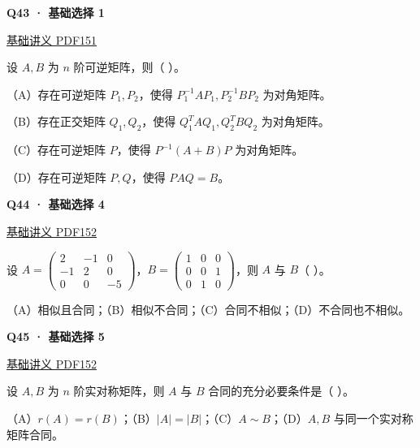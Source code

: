 \documentclass[UTF8,fontset=fandol,11pt,a4paper]{ctexart}
\newcommand{\source}[1]{{\footnotesize\color{Muted}#1\par}}
\newcommand{\qtitle}[2]{\par\needspace{5\baselineskip}\hypertarget{#1}{}\label{#1}\textbf{#2}\par}
\begin{document}
\begin{minipage}{\linewidth}
\qtitle{B-MC-01}{Q43 · 基础选择 1}
\source{\href{file:///Users/skyintelligence/Desktop/\%E5\%BE\%97\%E8\%AF\%BB\%E4\%B8\%AA\%E7\%A0\%94-\%E5\%8C\%97\%E5\%A4\%A7\%E8\%BD\%AF\%E5\%BE\%AE/\%E6\%95\%B0\%E5\%AD\%A6\%20150/\%E8\%AE\%B2\%E4\%B9\%89/\%E3\%80\%90\%E4\%B8\%80\%E9\%AB\%98\%E6\%95\%B0Kira\%E3\%80\%9127\%E8\%80\%83\%E7\%A0\%94\%E7\%BA\%BF\%E4\%BB\%A3\%E5\%9F\%BA\%E7\%A1\%80\%E8\%AE\%B2\%E4\%B9\%89\%26\%E4\%B9\%A0\%E9\%A2\%98-\%E7\%94\%B5\%E5\%AD\%90\%E7\%89\%88.pdf\#page=151}{基础讲义 PDF151}}
设 $A,B$ 为 $n$ 阶可逆矩阵，则（ ）。

（A）存在可逆矩阵 $P_1,P_2$，使得 $P_1^{-1}AP_1,P_2^{-1}BP_2$ 为对角矩阵。

（B）存在正交矩阵 $Q_1,Q_2$，使得 $Q_1^TAQ_1,Q_2^TBQ_2$ 为对角矩阵。

（C）存在可逆矩阵 $P$，使得 $P^{-1}(A+B)P$ 为对角矩阵。

（D）存在可逆矩阵 $P,Q$，使得 $PAQ=B$。
\end{minipage}\par\vspace{7mm}
\begin{minipage}{\linewidth}
\qtitle{B-MC-04}{Q44 · 基础选择 4}
\source{\href{file:///Users/skyintelligence/Desktop/\%E5\%BE\%97\%E8\%AF\%BB\%E4\%B8\%AA\%E7\%A0\%94-\%E5\%8C\%97\%E5\%A4\%A7\%E8\%BD\%AF\%E5\%BE\%AE/\%E6\%95\%B0\%E5\%AD\%A6\%20150/\%E8\%AE\%B2\%E4\%B9\%89/\%E3\%80\%90\%E4\%B8\%80\%E9\%AB\%98\%E6\%95\%B0Kira\%E3\%80\%9127\%E8\%80\%83\%E7\%A0\%94\%E7\%BA\%BF\%E4\%BB\%A3\%E5\%9F\%BA\%E7\%A1\%80\%E8\%AE\%B2\%E4\%B9\%89\%26\%E4\%B9\%A0\%E9\%A2\%98-\%E7\%94\%B5\%E5\%AD\%90\%E7\%89\%88.pdf\#page=152}{基础讲义 PDF152}}
设 $A=\begin{pmatrix}2&-1&0\\-1&2&0\\0&0&-5\end{pmatrix}$，$B=\begin{pmatrix}1&0&0\\0&0&1\\0&1&0\end{pmatrix}$，则 $A$ 与 $B$（ ）。

（A）相似且合同；（B）相似不合同；（C）合同不相似；（D）不合同也不相似。
\end{minipage}\par\vspace{7mm}
\begin{minipage}{\linewidth}
\qtitle{B-MC-05}{Q45 · 基础选择 5}
\source{\href{file:///Users/skyintelligence/Desktop/\%E5\%BE\%97\%E8\%AF\%BB\%E4\%B8\%AA\%E7\%A0\%94-\%E5\%8C\%97\%E5\%A4\%A7\%E8\%BD\%AF\%E5\%BE\%AE/\%E6\%95\%B0\%E5\%AD\%A6\%20150/\%E8\%AE\%B2\%E4\%B9\%89/\%E3\%80\%90\%E4\%B8\%80\%E9\%AB\%98\%E6\%95\%B0Kira\%E3\%80\%9127\%E8\%80\%83\%E7\%A0\%94\%E7\%BA\%BF\%E4\%BB\%A3\%E5\%9F\%BA\%E7\%A1\%80\%E8\%AE\%B2\%E4\%B9\%89\%26\%E4\%B9\%A0\%E9\%A2\%98-\%E7\%94\%B5\%E5\%AD\%90\%E7\%89\%88.pdf\#page=152}{基础讲义 PDF152}}
设 $A,B$ 为 $n$ 阶实对称矩阵，则 $A$ 与 $B$ 合同的充分必要条件是（ ）。

（A）$r(A)=r(B)$；（B）$|A|=|B|$；（C）$A\sim B$；（D）$A,B$ 与同一个实对称矩阵合同。
\end{minipage}\par\vspace{7mm}
\end{document}
